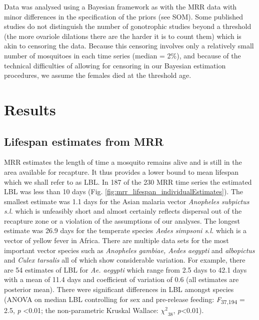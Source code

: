 \documentclass[]{article}
\begin{document}
Data was analysed using a Bayesian framework as with the MRR data with
minor differences in the specification of the priors (see SOM). Some
published studies do not distinguish the number of gonotrophic studies
beyond a threshold (the more ovariole dilations there are the harder it
is to count them) which is akin to censoring the data. Because this
censoring involves only a relatively small number of mosquitoes in each
time series (median = 2\%), and because of the technical difficulties of
allowing for censoring in our Bayesian estimation procedures, we assume
the females died at the threshold age.

\section{Results}\label{results}

\subsection{Lifespan estimates from
MRR}\label{lifespan-estimates-from-mrr}

MRR estimates the length of time a mosquito remains alive and is still
in the area available for recapture. It thus provides a lower bound to mean
lifespan which we shall refer to as LBL. In 187 of the 230 MRR time
series the estimated LBL was less than 10 days (Fig. \ref{fig:mrr_lifespan_individualEstimates}). The smallest
estimate was 1.1 days for the Asian malaria vector
\emph{Anopheles subpictus s.l.} which is unfeasibly short and almost
certainly reflects dispersal out of the recapture zone or a violation of
the assumptions of our analyses. The longest estimate was 26.9 days for
the temperate species \emph{Aedes simpsoni s.l.} which is a vector of
yellow fever in Africa. There are multiple data sets for the most
important vector species such as \emph{Anopheles gambiae, Aedes aegypti}
and \emph{albopictus} and \emph{Culex tarsalis} all of which show
considerable variation. For example, there are 54 estimates of LBL for
\emph{Ae. aegypti} which range from 2.5 days to 42.1 days with a mean of
11.4 days and coefficient of variation of 0.6 (all estimates are posterior mean). There were significant
differences in LBL amongst species (ANOVA on median LBL controlling for
sex and pre-release feeding: \emph{F}\textsubscript{37,194} = 2.5,
\emph{p} \textless{}0.01; the non-parametric Kruskal Wallace:
\({\chi^{2}}_{38}\), \emph{p}\textless{}0.01).
\end{document}
